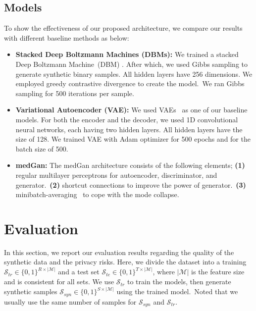 \documentclass[letterpaper]{article} \usepackage{aaai20}  \usepackage{times}  \usepackage{helvet} \usepackage{courier}  \usepackage[hyphens]{url}  \usepackage{graphicx} \urlstyle{rm} \def\UrlFont{\rm}  \usepackage{graphicx}  \frenchspacing  \setlength{\pdfpagewidth}{8.5in}  \setlength{\pdfpageheight}{11in}
\begin{document}
\subsection{Models}\label{sec:Experimentssub:Models}

To show the effectiveness of our proposed architecture, we compare our results with different baseline methods as below:

\begin{itemize}
\item \textbf{Stacked Deep Boltzmann Machines (DBMs):} We trained a stacked Deep Boltzmann Machine~(DBM) \cite{hinton2009replicated}. After which, we used Gibbs sampling to generate synthetic binary samples. All hidden layers have 256 dimensions. We employed greedy contrastive divergence to create the model.~We ran Gibbs sampling for 500 iterations per sample.

\item \textbf{Variational Autoencoder (VAE):} We used VAEs~\cite{kingma2013auto} as one of our baseline models.
For both the encoder and the decoder, we used 1D convolutional neural networks, each having two hidden layers.
All hidden layers have the size of 128.
We trained VAE with Adam optimizer for 500 epochs and for the batch size of 500.

\item \textbf{medGan:} The medGan \cite{choi2017generating} architecture consists of the following elements; 
\textbf{(1)} regular multilayer perceptrons for autoencoder, discriminator, and generator.~\textbf{(2)} shortcut connections to improve the power of generator.~\textbf{(3)} minibatch-averaging~\cite{choi2017generating} to cope with the mode collapse.

\end{itemize}

\section{Evaluation}\label{sec:Evaluation}

In this section, we report our evaluation results regarding the quality of the synthetic data and the privacy risks. Here, we divide the dataset into a training $\mathcal{S}_{tr} \in \{0,1\}^{R \times |\mathcal{M}|}$ and a test set $\mathcal{S}_{te} \in \{0,1\}^{T \times |\mathcal{M}|}$, where $|\mathcal{M}|$ is the feature size and is consistent for all sets. We use $\mathcal{S}_{tr}$ to train the models, then generate synthetic samples $\mathcal{S}_{syn} \in \{0,1\}^{S \times |\mathcal{M}|}$ using the trained model.~Noted that we usually use the same number of samples for $\mathcal{S}_{syn}$ and $\mathcal{S}_{tr}$.
\end{document}
